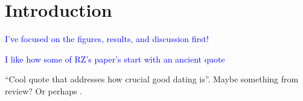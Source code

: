 \documentclass[draft]{agujournal2019}
\newcommand{\ijk}{\textcolor{blue}}
\begin{document}

%
%
%
%






\section{Introduction}\label{sec:intro}

\ijk{I've focused on the figures, results, and discussion first!}

\ijk{I like how some of RZ's paper's start with an ancient quote}

``Cool quote that addresses how crucial good dating is''.
Maybe something from  review? Or perhaps .
\end{document}
